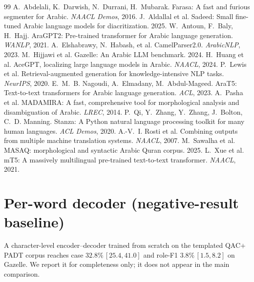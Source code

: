 \documentclass[10pt,a4paper,twocolumn]{article}
\begin{document}

\begin{thebibliography}{99}\small
{} A.~Abdelali, K.~Darwish, N.~Durrani, H.~Mubarak. Farasa: A fast and furious segmenter for Arabic. \emph{NAACL Demos}, 2016.
 J.~Aldallal et al. Sadeed: Small fine-tuned Arabic language models for diacritization. 2025.
 W.~Antoun, F.~Baly, H.~Hajj. AraGPT2: Pre-trained transformer for Arabic language generation. \emph{WANLP}, 2021.
 A.~Elshabrawy, N.~Habash, et al. CamelParser2.0. \emph{ArabicNLP}, 2023.
 M.~Hijjawi et al. Gazelle: An Arabic LLM benchmark. 2024.
 H.~Huang et al. AceGPT, localizing large language models in Arabic. \emph{NAACL}, 2024.
 P.~Lewis et al. Retrieval-augmented generation for knowledge-intensive NLP tasks. \emph{NeurIPS}, 2020.
 E.~M.~B. Nagoudi, A.~Elmadany, M.~Abdul-Mageed. AraT5: Text-to-text transformers for Arabic language generation. \emph{ACL}, 2023.
 A.~Pasha et al. MADAMIRA: A fast, comprehensive tool for morphological analysis and disambiguation of Arabic. \emph{LREC}, 2014.
 P.~Qi, Y.~Zhang, Y.~Zhang, J.~Bolton, C.~D. Manning. Stanza: A Python natural language processing toolkit for many human languages. \emph{ACL Demos}, 2020.
 A.-V.~I. Rosti et al. Combining outputs from multiple machine translation systems. \emph{NAACL}, 2007.
 M.~Sawalha et al. MASAQ: morphological and syntactic Arabic Quran corpus. 2025.
 L.~Xue et al. mT5: A massively multilingual pre-trained text-to-text transformer. \emph{NAACL}, 2021.
\end{thebibliography}

\appendix
\section{Per-word decoder (negative-result baseline)}
\label{app:decoder}
A character-level encoder--decoder trained from scratch on the templated QAC$+$PADT corpus reaches case $32.8\%\,[25.4, 41.0]$ and role-F1 $3.8\%\,[1.5, 8.2]$ on Gazelle. We report it for completeness only; it does not appear in the main comparison.
\end{document}
